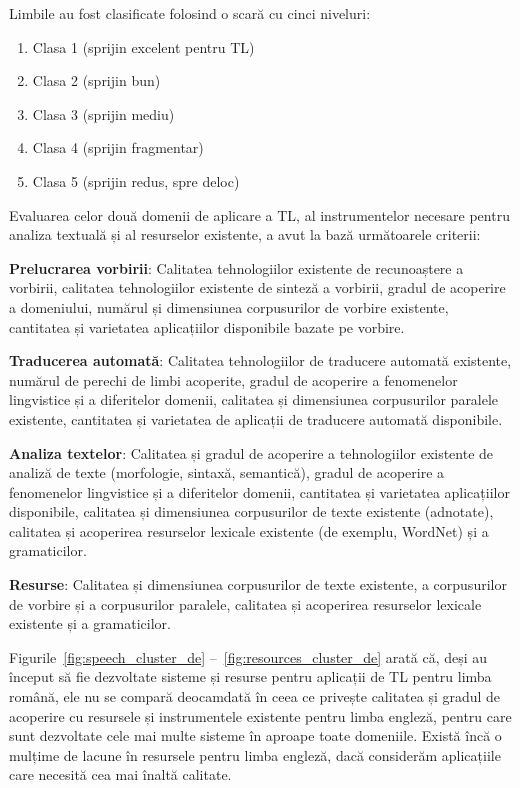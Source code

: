\begin{multicols}{2}
Limbile au fost clasificate folosind o scară cu cinci niveluri:
\begin{enumerate}
      \item Clasa 1 (sprijin excelent pentru TL)
      \item Clasa 2 (sprijin bun)
      \item Clasa 3 (sprijin mediu)
      \item Clasa 4 (sprijin fragmentar) 
      \item Clasa 5 (sprijin redus, spre deloc)
\end{enumerate}

Evaluarea celor două domenii de aplicare a TL, al instrumentelor necesare pentru analiza textuală și al resurselor existente, a avut la bază următoarele criterii:

\textbf{Prelucrarea vorbirii}: Calitatea tehnologiilor existente de recunoaștere a vorbirii, calitatea tehnologiilor existente de sinteză a vorbirii, gradul de acoperire a domeniului, numărul și dimensiunea corpusurilor de vorbire existente, cantitatea și varietatea aplicațiilor disponibile bazate pe vorbire.

\textbf{Traducerea automată}: Calitatea tehnologiilor de traducere automată existente, numărul de perechi de limbi acoperite, gradul de acoperire a fenomenelor lingvistice și a diferitelor domenii, calitatea și dimensiunea corpusurilor paralele existente, cantitatea și varietatea de aplicații de traducere automată disponibile.

\textbf{Analiza textelor}: Calitatea și gradul de acoperire a tehnologiilor existente de analiză de texte (morfologie, sintaxă, semantică), gradul de acoperire a fenomenelor lingvistice și a diferitelor domenii, cantitatea și varietatea aplicațiilor disponibile, calitatea și dimensiunea corpusurilor de texte existente (adnotate), calitatea și acoperirea resurselor lexicale existente (de exemplu, WordNet) și a gramaticilor.

\textbf{Resurse}: Calitatea și dimensiunea corpusurilor de texte existente, a corpusurilor de vorbire și a corpusurilor paralele, calitatea și acoperirea resurselor lexicale existente și a gramaticilor.

Figurile~\ref{fig:speech_cluster_de} --~\ref{fig:resources_cluster_de} arată că, deși au început să fie dezvoltate sisteme și resurse pentru aplicații de TL pentru limba română, ele nu se compară deocamdată în ceea ce privește calitatea și gradul de acoperire cu resursele și instrumentele existente pentru limba engleză, pentru care sunt dezvoltate cele mai multe sisteme în aproape toate domeniile. Există încă o mulțime de lacune în resursele pentru limba engleză, dacă considerăm aplicațiile care necesită cea mai înaltă calitate.


\end{multicols}
